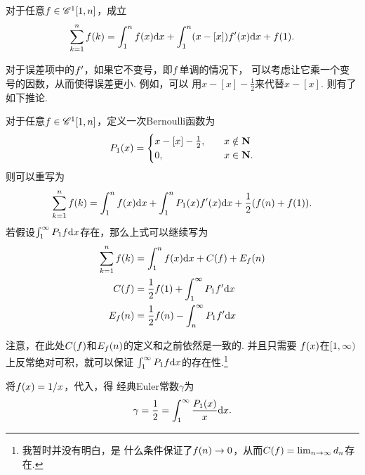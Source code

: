    \begin{thm}[一次导数形式的Euler求和公式]
      对于任意$\mathnormal{f}\in\mathscr{C}^1[1,n]$，成立
      \begin{equation}
        \label{equ: 一次导数Euler求和公式}
        \sum_{k=1}^n\mathnormal{f}(k) = \int_1^n\mathnormal{f}(x)\mathrm{d} x +
        \int_1^n(x-[x])\mathnormal{f}^\prime(x)\mathrm{d} x + \mathnormal{f}(1).
      \end{equation}
    \end{thm}
    \remark
      对于误差项中的$\mathnormal{f}^\prime$，如果它不变号，即$\mathnormal{f}$单调的情况下，
      可以考虑让它乘一个变号的因数，从而使得误差更小. 例如，可以
      用$x-[x]-\frac{1}{2}$来代替$x-[x]$. 则有了如下推论.

    \begin{cor}
      \label{cor: 一次Euler求和公式}
      对于任意$\mathnormal{f}\in\mathscr{C}^1[1,n]$，定义一次Bernoulli函数为
      \[
        P_1(x) =
        \begin{cases}
          x - [x] - \frac{1}{2},\quad& x \notin \mathbf{N} \\
          0, & x\in\mathbf{N}.
        \end{cases}
      \]
      则可以重写为
      \begin{equation}
        \sum_{k=1}^n\mathnormal{f}(k) = \int_1^n\mathnormal{f}(x)\mathrm{d} x +
        \int_1^nP_1(x)\mathnormal{f}^\prime(x)\mathrm{d} x + \frac{1}{2}(\mathnormal{f}(n) + \mathnormal{f}(1)).
      \end{equation}
      若假设$\int_1^{\infty}P_1\mathnormal{f}\mathrm{d} x$存在，那么上式可以继续写为
      \[
        \begin{split}
        \sum_{k=1}^n\mathnormal{f}(k) &= \int_1^n\mathnormal{f}(x)\mathrm{d} x + C(\mathnormal{f}) + E_{\mathnormal{f}}(n) \\
        C(\mathnormal{f}) &= \frac{1}{2}\mathnormal{f}(1) + \int_1^{\infty}P_1\mathnormal{f}^\prime\mathrm{d} x\\
        E_{\mathnormal{f}}(n) &= \frac{1}{2}\mathnormal{f}(n) - \int_n^{\infty}P_1\mathnormal{f}^\prime\mathrm{d} x
      \end{split}\]
    \end{cor}
    \remark
      注意，在此处$C(\mathnormal{f})$和$E_{\mathnormal{f}}(n)$的定义和之前依然是一致的. 并且只需要
      $\mathnormal{f}(x)$在$[1, \infty)$上反常绝对可积，就可以保证
      $\int_1^\infty P_1\mathnormal{f}\mathrm{d} x$的存在性.\footnote{我暂时并没有明白，是
      什么条件保证了$\mathnormal{f}(n)\to 0$，从而$C(\mathnormal{f}) = \lim_{n\to\infty}d_n$存在.}

    \begin{cor}[Euler常数]
      将$\mathnormal{f}(x) = 1/x$，代入，得
      经典Euler常数$\gamma$为
      \[
        \gamma = \frac{1}{2} = \int_1^\infty \frac{P_1(x)}{x}\mathrm{d} x.
      \]
    \end{cor}

